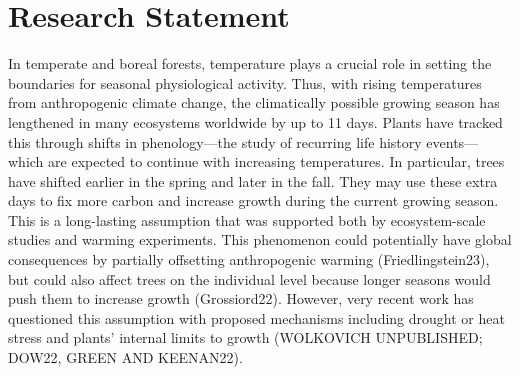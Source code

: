 \documentclass[11pt,letter]{article}
\begin{document}
\section {Research Statement}
In temperate and boreal forests, temperature plays a crucial role in setting the boundaries for seasonal physiological activity. Thus, with rising temperatures from anthropogenic climate change, the climatically possible growing season has lengthened in many ecosystems worldwide by up to 11 days. Plants have tracked this through shifts in phenology—the study of recurring life history events—which are expected to continue with increasing temperatures. In particular, trees have shifted earlier in the spring and later in the fall. They may use these extra days to fix more carbon and increase growth during the current growing season. This is a long-lasting assumption that was supported both by ecosystem-scale studies and warming experiments. This phenomenon could potentially have global consequences by partially offsetting anthropogenic warming (Friedlingstein23), but could also affect trees on the individual level because longer seasons would push them to increase growth (Grossiord22). However, very recent work has questioned this assumption with proposed mechanisms including drought or heat stress and plants' internal limits to growth (WOLKOVICH UNPUBLISHED; DOW22, GREEN AND KEENAN22). 
\end{document}

